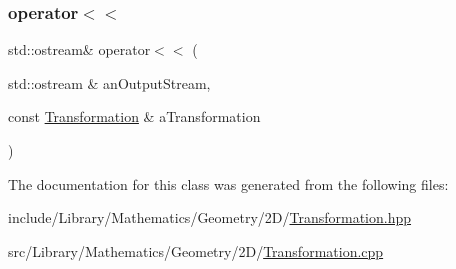 \subsubsection{\texorpdfstring{operator$<$$<$}{operator<<}}
{\footnotesize\ttfamily std\+::ostream\& operator$<$$<$ (\begin{DoxyParamCaption}\item[{std\+::ostream \&}]{an\+Output\+Stream,  }\item[{const \hyperlink{classlibrary_1_1math_1_1geom_1_1d2_1_1_transformation}{Transformation} \&}]{a\+Transformation }\end{DoxyParamCaption})\hspace{0.3cm}{\ttfamily [friend]}}



The documentation for this class was generated from the following files\+:\begin{DoxyCompactItemize}
\item 
include/\+Library/\+Mathematics/\+Geometry/2\+D/\hyperlink{2_d_2_transformation_8hpp}{Transformation.\+hpp}\item 
src/\+Library/\+Mathematics/\+Geometry/2\+D/\hyperlink{2_d_2_transformation_8cpp}{Transformation.\+cpp}\end{DoxyCompactItemize}
